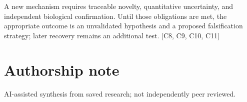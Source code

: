 \documentclass[11pt]{article}
\begin{document}
A new mechanism requires traceable novelty, quantitative uncertainty, and independent biological confirmation. Until those obligations are met, the appropriate outcome is an unvalidated hypothesis and a proposed falsification strategy; later recovery remains an additional test. [C8, C9, C10, C11]

\section*{Authorship note}
AI-assisted synthesis from saved research; not independently peer reviewed.
\end{document}
